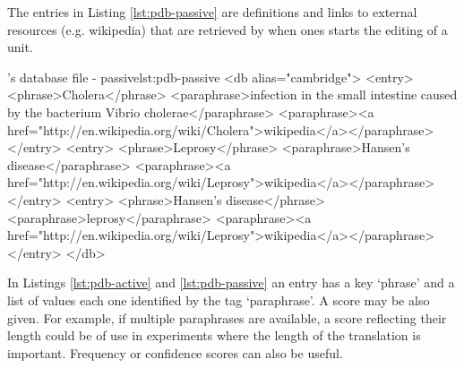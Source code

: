 The entries in Listing \ref{lst:pdb-passive} are definitions and links to external resources (e.g. wikipedia) that are retrieved by \PET when ones starts the editing of a unit.

\begin{workflow-code}{\PET's database file - passive}{lst:pdb-passive}
<db alias="cambridge">
  <entry>
    <phrase>Cholera</phrase>
    <paraphrase>infection in the small intestine caused by the bacterium Vibrio cholerae</paraphrase>
    <paraphrase><a href="http://en.wikipedia.org/wiki/Cholera">wikipedia</a></paraphrase>
  </entry>
  <entry>
    <phrase>Leprosy</phrase>
    <paraphrase>Hansen's disease</paraphrase>
    <paraphrase><a href="http://en.wikipedia.org/wiki/Leprosy">wikipedia</a></paraphrase>
  </entry>
  <entry>
    <phrase>Hansen's disease</phrase>
    <paraphrase>leprosy</paraphrase>
    <paraphrase><a href="http://en.wikipedia.org/wiki/Leprosy">wikipedia</a></paraphrase>
  </entry>  
</db>
\end{workflow-code}

In Listings \ref{lst:pdb-active} and \ref{lst:pdb-passive} an entry has a key `phrase' and a list of values each one identified by the tag `paraphrase'. A score may be also given. For example, if multiple paraphrases are available, a score reflecting their length could be of use in experiments where the length of the translation is important. Frequency or confidence scores can also be useful.	

